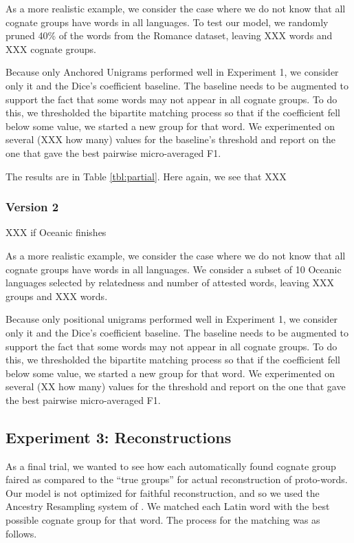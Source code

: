 \documentclass[11pt,a4paper]{article}
\begin{document}
As a more realistic example, we consider the case where we do not
know that all cognate groups have words in all languages. To test
our model, we randomly pruned 40\% of the words from the Romance
dataset, leaving XXX words and XXX cognate groups.

Because only Anchored Unigrams performed well in Experiment 1, we
consider only it and the Dice's coefficient baseline. The baseline
needs to be augmented to support the fact that some words may not
appear in all cognate groups. To do this, we thresholded the bipartite
matching process so that if the coefficient fell below some value,
we started a new group for that word. We experimented on several (XXX how many)
values for the baseline's threshold and report on the one that gave
the best pairwise micro-averaged F1.

The results are in Table \ref{tbl:partial}. Here again, we see that
XXX


\subsubsection{Version 2}

XXX if Oceanic finishes

As a more realistic example, we consider the case where we do not
know that all cognate groups have words in all languages. We consider
a subset of 10 Oceanic languages selected by relatedness and number
of attested words, leaving XXX groups and XXX words.

Because only positional unigrams performed well in Experiment 1,
we consider only it and the Dice's coefficient baseline. The baseline
needs to be augmented to support the fact that some words may not
appear in all cognate groups. To do this, we thresholded the bipartite
matching process so that if the coefficient fell below some value,
we started a new group for that word. We experimented on several (XX how many)
values for the threshold and report on the one that gave the best
pairwise micro-averaged F1.

\subsection{Experiment 3: Reconstructions}

As a final trial, we wanted to see how each automatically found
cognate group faired as compared to the ``true groups'' for actual
reconstruction of proto-words. Our model is not optimized for
faithful reconstruction, and so we used the Ancestry Resampling
system of . We matched each Latin word
with the best possible cognate group for that word. The process for
the matching was as follows.
\end{document}
